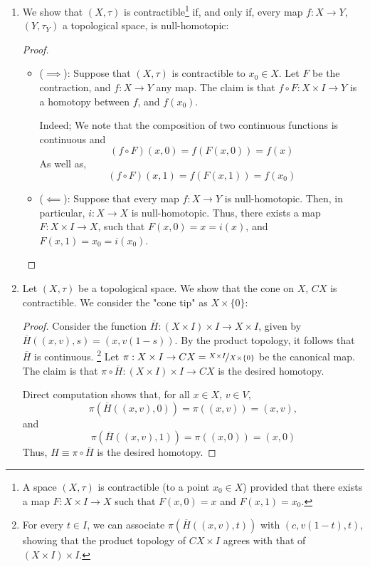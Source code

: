 \documentclass{book}
\begin{document}
\begin{enumerate}[(1)]
    \item We show  that $(X, \tau)$ is contractible\footnote{A space $(X, \tau)$ is contractible (to a point $x_0 \in X$) provided that there exists a map $F: X \times I \rightarrow X$ such that $F(x, 0) = x$ and $F(x,1) = x_0$.} if, and only if, every map $f:X \rightarrow Y$, $(Y, \tau_Y)$ a topological space, is null-homotopic: 
        \begin{proof}
            $ $\newline
            \begin{itemize}
                \item[] ($\implies$): Suppose that $(X, \tau)$ is contractible to $x_0 \in X$. Let $F$ be the contraction, and $f: X \rightarrow Y$ any map. The claim is that $f \circ F: X\times I \rightarrow Y$ is a homotopy between $f$, and $f(x_0)$. 
                    \par Indeed; We note that the composition of two continuous functions is continuous and 
                    $$(f \circ F)(x,0) = f(F(x,0)) = f(x)$$ As well as,  
                    $$(f \circ F)(x,1) = f(F(x,1)) = f(x_0)$$

                \item[] ($\impliedby$): Suppose that every map $f:X \rightarrow Y$ is null-homotopic. Then, in particular, $i:X \rightarrow X$ is null-homotopic. Thus, there exists a map $F:X \times I \rightarrow X$, such that $F(x,0) = x =i(x)$, and $F(x,1) = x_0 = i(x_0)$.
            \end{itemize}
        \end{proof}

    \item Let $(X, \tau)$ be a topological space. We show that the cone on $X$, $CX$ is contractible. We consider the "cone tip" as $X \times \{0\}$:     \begin{proof} Consider the function $\overline{H}: (X \times I) \times I \rightarrow X \times I$, given by $\overline{H}((x,v),s) = (x,v(1-s))$. By the     product topology, it follows that $\overline{H}$ is continuous. \footnote{For every $t \in I$, we can associate $\pi(\overline{H}((x,v),t))$ with           $(c,v(1-t),t)$, showing that the product topology of $CX \times I$ agrees with that of $(X \times I) \times I$.} Let $\pi:X \times I            \rightarrow CX = \nicefrac{X \times I}{X \times \{0\}}$ be the canonical map. The claim is that $\pi \circ \overline{H}: (X \times I) \times I     \rightarrow CX$ is the desired homotopy.
            \par Direct computation shows that, for all $x \in X$, $v \in V$,
            $$\pi(\overline{H}( (x,v),0)) = \pi((x,v)) = (x,v),$$
            and 
            $$\pi(\overline{H}( (x,v),1)) = \pi((x,0)) = (x,0)$$
            Thus, $H \equiv \pi \circ \overline{H}$ is the desired homotopy. 
    \end{proof}

\end{enumerate}
\end{document}
